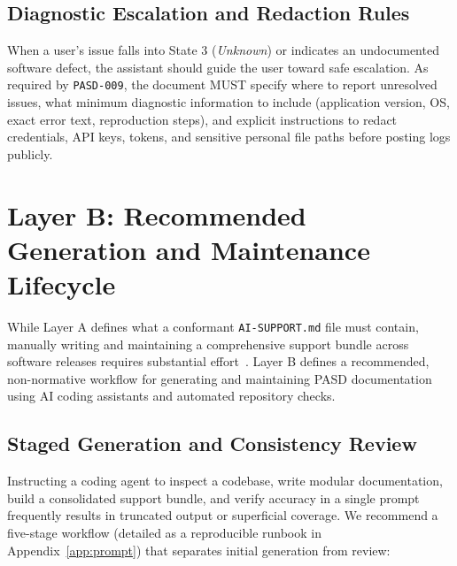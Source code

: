 \documentclass[12pt, a4paper]{article}
\begin{document}
\subsection{Diagnostic Escalation and Redaction Rules}
When a user's issue falls into State 3 (\textit{Unknown}) or indicates an undocumented software defect, the assistant should guide the user toward safe escalation. As required by \texttt{PASD-009}, the document MUST specify where to report unresolved issues, what minimum diagnostic information to include (application version, OS, exact error text, reproduction steps), and explicit instructions to redact credentials, API keys, tokens, and sensitive personal file paths before posting logs publicly.


\section{Layer B: Recommended Generation and Maintenance Lifecycle}
\label{sec:maintenance}

While Layer A defines what a conformant \texttt{AI-SUPPORT.md} file must contain, manually writing and maintaining a comprehensive support bundle across software releases requires substantial effort~\citep{parnas1994software, lethbridge2003software}. Layer B defines a recommended, non-normative workflow for generating and maintaining PASD documentation using AI coding assistants and automated repository checks.

\subsection{Staged Generation and Consistency Review}
Instructing a coding agent to inspect a codebase, write modular documentation, build a consolidated support bundle, and verify accuracy in a single prompt frequently results in truncated output or superficial coverage. We recommend a five-stage workflow (detailed as a reproducible runbook in Appendix~\ref{app:prompt}) that separates initial generation from review:
\end{document}
